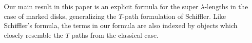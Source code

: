 Our main result in this paper is an explicit formula for the super $\lambda$-lengths in the case of marked disks, generalizing the $T$-path formulation of Schiffler.
 Like Schiffler's formula, the terms in our formula are also indexed by objects which closely resemble the $T$-paths from the classical case.
